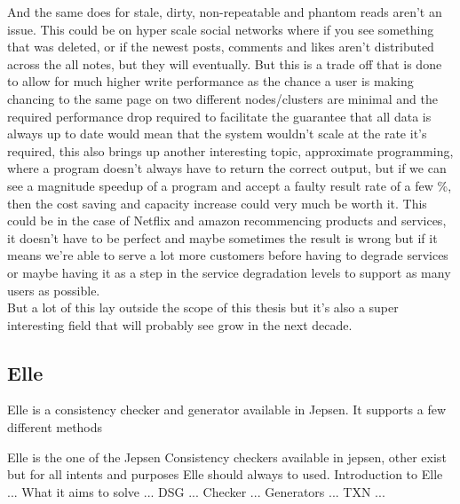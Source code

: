 \documentclass[a4paper,10pt,titlepage]{report}
\begin{document}
    And the same does for stale, dirty, non-repeatable and phantom reads aren't an issue. This could be on hyper scale social networks where if you see something that was deleted, or if the newest posts, comments and likes aren't distributed across the all notes, but they will eventually. But this is a trade off that is done to allow for much higher write performance as the chance a user is making chancing to the same page on two different nodes/clusters are minimal and the required performance drop required to facilitate the guarantee that all data is always up to date would mean that the system wouldn't scale at the rate it's required, this also brings up another interesting topic, approximate programming, where a program doesn't always have to return the correct output, but if we can see a magnitude speedup of a program and accept a faulty result rate of a few \%, then the cost saving and capacity increase could very much be worth it. This could be in the case of Netflix and amazon recommencing products and services, it doesn't have to be perfect and maybe sometimes the result is wrong but if it means we're able to serve a lot more customers before having to degrade services or maybe having it as a step in the service degradation levels to support as many users as possible. \\
    \vspace{5mm}
    But a lot of this lay outside the scope of this thesis but it's also a super interesting field that will probably see grow in the next decade.


    \subsection{Elle}
    
    
    Elle is a consistency checker and generator available in Jepsen. It supports a few different methods 
    
    Elle is the one of the Jepsen Consistency checkers available in jepsen, other exist but for all intents and purposes Elle should always to used. 
    Introduction to Elle
    ...
    What it aims to solve
    ...
    DSG
    ...
    Checker
    ...
    Generators
    ...
    TXN
    ...
    

\end{document}
